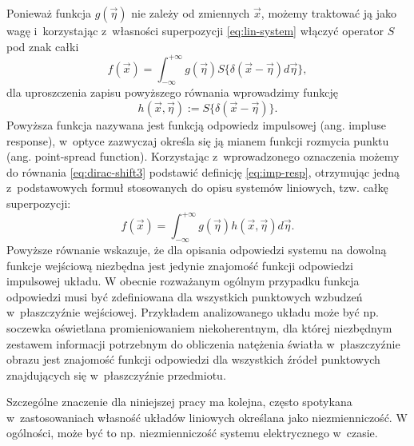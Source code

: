 Ponieważ funkcja $g(\vec{\eta})$ nie zależy od zmiennych $\vec{x}$, możemy traktować ją jako wagę i~korzystając z~własności superpozycji \ref{eq:lin-system} włączyć operator $S{}$ pod znak całki
\begin{equation}
f(\vec{x})=\int_{-\infty}^{+\infty} g(\vec{\eta})  S\{\delta(\vec{x}-\vec{\eta}) d \vec{\eta} \},
\label{eq:dirac-shift3}
\end{equation}
dla uproszczenia zapisu powyższego równania wprowadzimy funkcję
\begin{equation}
h(\vec{x},\vec{\eta}):=S\{\delta(\vec{x}-\vec{\eta})\}.
\label{eq:imp-resp}
\end{equation}
Powyższa funkcja nazywana jest funkcją odpowiedz impulsowej (ang. impluse response), w~optyce zazwyczaj określa się ją mianem funkcji rozmycia punktu (ang. point-spread function). Korzystając z~wprowadzonego oznaczenia możemy do równania \ref{eq:dirac-shift3}  podstawić definicję \ref{eq:imp-resp}, otrzymując jedną z~podstawowych formuł stosowanych do opisu systemów liniowych, tzw. całkę superpozycji:
\begin{equation}
f(\vec{x})=\int_{-\infty}^{+\infty} g(\vec{\eta})  h(\vec{x},\vec{\eta}) d \vec{\eta} .
\label{eq:sup-int}
\end{equation}
Powyższe równanie wskazuje, że dla opisania odpowiedzi systemu na dowolną funkcje wejściową niezbędna jest jedynie znajomość funkcji odpowiedzi impulsowej układu. W obecnie rozważanym ogólnym przypadku funkcja odpowiedzi musi być zdefiniowana dla wszystkich punktowych wzbudzeń w~płaszczyźnie wejściowej. Przykładem analizowanego układu może być np. soczewka oświetlana promieniowaniem niekoherentnym, dla której niezbędnym zestawem informacji potrzebnym do obliczenia natężenia światła w~płaszczyźnie obrazu jest znajomość funkcji odpowiedzi dla wszystkich źródeł punktowych znajdujących się w~płaszczyźnie przedmiotu. 

Szczególne znaczenie dla niniejszej pracy ma kolejna, często spotykana w~zastosowaniach własność układów liniowych określana jako niezmienniczość. W ogólności, może być to np. niezmienniczość systemu elektrycznego w~czasie. 

